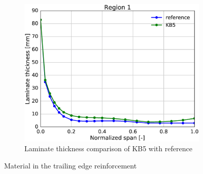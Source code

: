 \begin{figure}[tph]
\begin{subfigure}{\textwidth}
\centering
\includegraphics[width=0.50\linewidth]{figures/KB6_final/KB5_r01_thickness.eps}
\caption{Laminate thickness comparison of KB5 with reference}
\label{subfig:KB5_thick_r01}
\end{subfigure}
\caption{ Material in the trailing edge reinforcement}
\label{fig:KB5_mat_r01}
\end{figure}

